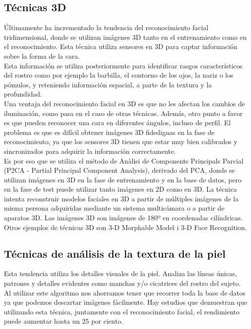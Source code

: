 \documentclass[a4paper,11pt]{article}
\begin{document}
	\subsection{Técnicas 3D}
	Últimamente ha incrementado la tendencia del reconocimiento facial tridimensional, donde se utilizan imágenes 3D tanto en el entrenamiento como en el reconocimiento. Esta técnica utiliza sensores en 3D para captar información sobre la forma de la cara.\\
	
	 Esta información se utiliza posteriormente para identificar rasgos característicos del rostro como por ejemplo la barbilla, el contorno de los ojos, la nariz o los pómulos, y reteniendo información espacial, a parte de la textura y la profundidad.\\
	 
	  Una ventaja del reconocimiento facial en 3D es que no les afectan los cambios de iluminación, como pasa en el caso de otras técnicas. Además, otro punto a favor es que pueden reconocer una cara en diferentes ángulos, incluso de perfil. El problema es que es difícil obtener imágenes 3D fidedignas en la fase de reconocimiento, ya que los sensores 3D tienen que estar muy bien calibrados y sincronizados para adquirir la información correctamente. \\
	  
	  Es por eso que se utiliza el método de Anàlisi de Components Principals Parcial (P2CA - Partial Principal Component Analysis), derivado del PCA, donde se utilizan imágenes en 3D en la fase de entrenamiento y en la base de datos, pero en la fase de test puede utilizar tanto imágenes en 2D como en 3D. La técnica intenta reconstruir modelos faciales en 3D a partir de múltiples imágenes de la misma persona adquiridas mediante un sistema multicámara o a partir de aparatos 3D. Las imágenes 3D son imágenes de 180º en coordenadas cilíndricas. Otros ejemplos de técnicas 3D son 3-D Morphable Model i 3-D Face Recognition.
	
 \subsection{Técnicas de análisis de la textura de la piel}
	Esta tendencia utiliza los detalles visuales de la piel. Analiza las líneas únicas, patrones y detalles evidentes como manchas y/o cicatrices del rostro del sujeto. \\
	
	Al utilizar este algoritmo nos ahorramos tener que recorrer toda la base de datos ya que podemos descartar imágenes fácilmente. Hay estudios que demuestran que utilizando esta técnica, juntamente con el reconocimiento facial, el rendimiento puede aumentar hasta un 25 por ciento.
 
\end{document}
